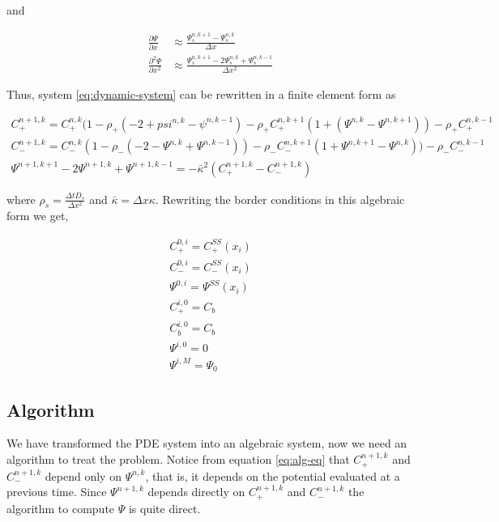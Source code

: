 and

\begin{align}
\frac{\partial \Psi}{\partial x} &\approx \frac{\Psi^{n, k+1}_s - \Psi^{n, k}_s}{\Delta x}\\
\frac{\partial^2 \Psi}{\partial x^2} &\approx \frac{\Psi^{n, k + 1}_s - 2\Psi^{n, k}_s + \Psi^{n, k-1}_s}{\Delta x^2}
\end{align}

Thus, system \ref{eq:dynamic-system} can be rewritten in a finite element form as

\begin{align}
C_+^{n+1,k} = C_+^{n,k}(1-\rho_+ (-2+psi^{n,k}-\psi^{n,k-1})- \rho_+ C_+^{n,k+1}(1 + (\Psi^{n,k}-\Psi^{n,k+1})) - \rho_+C_+^{n,k-1}& \\
C_-^{n+1,k} = C_-^{n,k}(1-\rho_-(-2-\Psi^{n,k}+\Psi^{n,k-1})) - \rho_- C_-^{n, k+1}(1+\Psi^{n,k+1}-\Psi^{n,k})) - \rho_- C_-^{n,k-1}& \\
 \Psi^{n+1,k+1}  - 2\Psi^{n+1,k} +\Psi^{n+1,k-1}  = -\bar{\kappa}^2 (C_+^{n+1,k} - C_-^{n+1,k})&
\label{eq:alg-eq}
\end{align}

where $\rho_s = \frac{\Delta t D_s}{\Delta x^2}$ and $\bar{\kappa} =\Delta x\kappa$. Rewriting the border conditions in this algebraic form we get,

\begin{align}
C_+^{0,i}  = C_+^{SS}(x_i) \\
C_-^{0,i}  = C_-^{SS}(x_i) \\
\Psi^{0, i} = \Psi^{SS} (x_i) \\
C_+^{i,0}  = C_b \\
C_b^{i,0}  = C_b \\
\Psi^{i, 0} = 0 \\
\Psi^{i, M} = \Psi_0
\label{eq:alg-border-cond}
\end{align}

\subsection{Algorithm}

We have transformed the PDE system into an algebraic system, now we need an algorithm to treat the problem. Notice from equation \ref{eq:alg-eq} that $C_+^{n+1,k}$ and $C_-^{n+1,k}$ depend only on $\Psi^{n,k}$, that is, it depends on the potential evaluated at a previous time. Since $\Psi^{n+1,k}$ depends directly on $C_+^{n+1,k}$ and  $C_-^{n+1,k}$ the algorithm to compute $\Psi$ is quite direct. 

